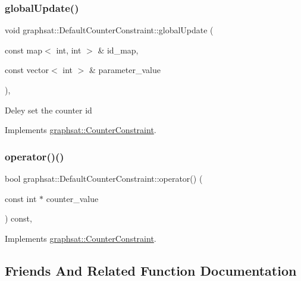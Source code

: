 \subsubsection{\texorpdfstring{globalUpdate()}{globalUpdate()}}
{\footnotesize\ttfamily void graphsat\+::\+Default\+Counter\+Constraint\+::global\+Update (\begin{DoxyParamCaption}\item[{const map$<$ int, int $>$ \&}]{id\+\_\+map,  }\item[{const vector$<$ int $>$ \&}]{parameter\+\_\+value }\end{DoxyParamCaption})\hspace{0.3cm}{\ttfamily [inline]}, {\ttfamily [virtual]}}

Deley set the counter id 

Implements \mbox{\hyperlink{classgraphsat_1_1_counter_constraint_aa467ff66b37a1cbc69f5eddb269aaa0d}{graphsat\+::\+Counter\+Constraint}}.

\mbox{\label{classgraphsat_1_1_default_counter_constraint_a0c7e9fd0402b59afdebfbc1764867aaa}} 
\subsubsection{\texorpdfstring{operator()()}{operator()()}}
{\footnotesize\ttfamily bool graphsat\+::\+Default\+Counter\+Constraint\+::operator() (\begin{DoxyParamCaption}\item[{const int $\ast$}]{counter\+\_\+value }\end{DoxyParamCaption}) const\hspace{0.3cm}{\ttfamily [inline]}, {\ttfamily [virtual]}}



Implements \mbox{\hyperlink{classgraphsat_1_1_counter_constraint_a1fb82c50097b34656ef5ca319dd352da}{graphsat\+::\+Counter\+Constraint}}.



\subsection{Friends And Related Function Documentation}
\mbox{\label{classgraphsat_1_1_default_counter_constraint_ad4b3c25c041701ae56dc1e78df779d2f}} 
